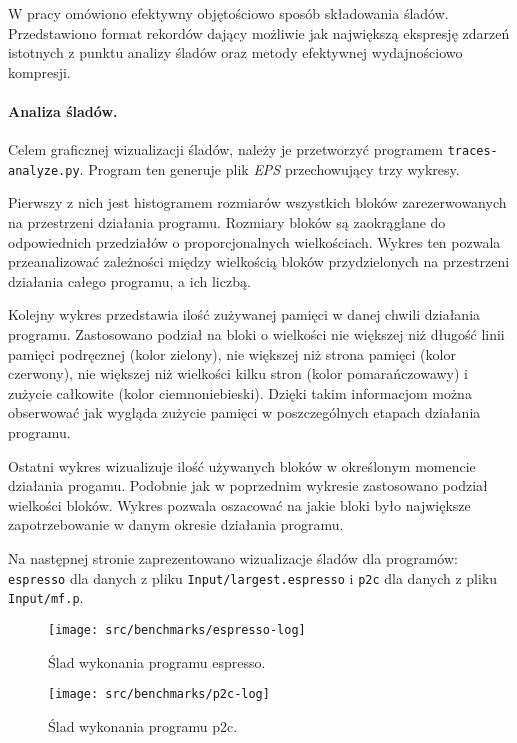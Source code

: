 \documentclass[12pt,a4paper,titlepage,twoside]{mwart}
\begin{document}
W pracy \cite{chilimbi00designing} omówiono efektywny objętościowo sposób
składowania śladów. Przedstawiono format rekordów dający możliwie jak
największą ekspresję zdarzeń istotnych z punktu analizy śladów oraz metody
efektywnej wydajnościowo kompresji.

\paragraph{Analiza śladów.} Celem graficznej wizualizacji śladów, należy je
przetworzyć programem \texttt{traces-analyze.py}. Program ten generuje plik
\textit{EPS} przechowujący trzy wykresy.

Pierwszy z nich jest histogramem rozmiarów wszystkich bloków zarezerwowanych na
przestrzeni działania programu. Rozmiary bloków są zaokrąglane do odpowiednich
przedziałów o proporcjonalnych wielkościach. Wykres ten pozwala przeanalizować
zależności między wielkością bloków przydzielonych na przestrzeni działania
całego programu, a ich liczbą.

Kolejny wykres przedstawia ilość zużywanej pamięci w danej chwili działania
programu. Zastosowano podział na bloki o wielkości nie większej niż długość
linii pamięci podręcznej (kolor zielony), nie większej niż strona pamięci
(kolor czerwony), nie większej niż wielkości kilku stron (kolor pomarańczowawy)
i zużycie całkowite (kolor ciemnoniebieski). Dzięki takim informacjom można
obserwować jak wygląda zużycie pamięci w poszczególnych etapach działania
programu.

Ostatni wykres wizualizuje ilość używanych bloków w określonym momencie
działania progamu. Podobnie jak w poprzednim wykresie zastosowano podział
wielkości bloków. Wykres pozwala oszacować na jakie bloki było największe
zapotrzebowanie w danym okresie działania programu.

Na następnej stronie zaprezentowano wizualizacje śladów dla programów:
\texttt{espresso} dla danych z pliku \texttt{Input/largest.espresso} i
\texttt{p2c} dla danych z pliku \texttt{Input/mf.p}.

\begin{figure}%
\centering
\texttt{[image: src/benchmarks/espresso-log]}
\caption{Ślad wykonania programu espresso.}

\vspace{0.5in}

\texttt{[image: src/benchmarks/p2c-log]}
\caption{Ślad wykonania programu p2c.}
\end{figure}
\end{document}
